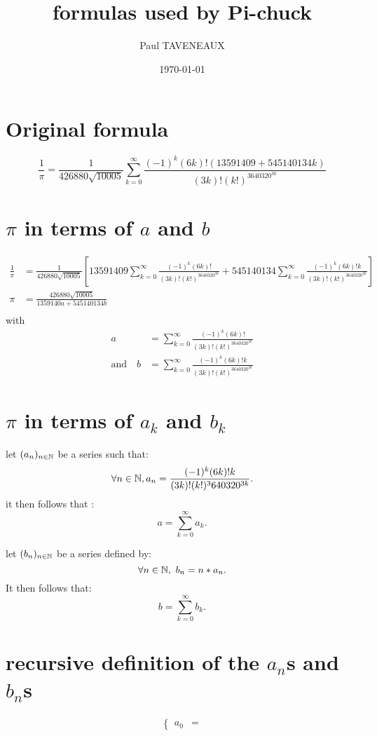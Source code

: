 \documentclass[fleqn]{report}
\title{formulas used by Pi-chuck}
\author{Paul TAVENEAUX}
\date{\today}
\begin{document}
\maketitle
\newpage

\section{Original formula}
\[
  \frac{1}{\pi} = \frac{1}{426880\sqrt{10005}}\sum_{ k = 0 }^{\infty}\frac{(-1)^k(6k)!(13591409 + 545140134k)}{(3k)!(k!)^3640320^{3k}}
\]

\section{$\pi$ in terms of $a$ and $b$}

\begin{align*}
  \frac{1}{\pi} &= \frac{1}{426880\sqrt{10005}}\left[13591409\sum_{k = 0}^{\infty}\frac{(-1)^k(6k)!}{(3k)!(k!)^3640320^{3k}} + 545140134\sum_{k = 0}^{\infty}\frac{(-1)^k(6k)!k}{(3k)!(k!)^3640320^{3k}}\right]\\
  \pi &= \frac{426880\sqrt{10005}}{1359140a + 545140134b}\\
\end{align*}
with
\begin{align*}
  a &= \sum_{k = 0}^{\infty}\frac{(-1)^k(6k)!}{(3k)!(k!)^3640320^{3k}}\\
  \text{and} \quad b &= \sum_{k = 0}^{\infty}\frac{(-1)^k(6k)!k}{(3k)!(k!)^3640320^{3k}}
\end{align*}

\section{$\pi$ in terms of $a_k$ and $b_k$}
let $(a_n)_{n \in \mathbb N}$ be a series such that:
\[
  \forall n \in \mathbb N, a_n = \frac{(-1)^k(6k)!k}{(3k)!(k!)^3640320^{3k}}
.\]
it then follows that :
\[
a = \sum_{k=0}^{\infty} a_k
.\] 

\noindent
let $(b_n)_{n \in \mathbb N}$ be a series defined by:
\[
\forall n  \in \mathbb N,\ b_n = n * a_n
.\] 
It then follows that:
\[
  b = \sum_{k=0}^{\infty} b_k
.\] 

\section{recursive definition of the $a_n$s and $b_n$s}

\begin{align*}
  \left\{
    \begin{aligned}
    a_0 &= 
    \end{aligned}
  \right.
\end{align*}
\end{document}
